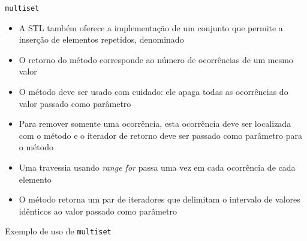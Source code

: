 \begin{frame}[fragile]{\texttt{multiset}}

    \begin{itemize}
        \item A STL também oferece a implementação de um conjunto que permite a inserção de 
            elementos repetidos, denominado 

        \item O retorno do método  corresponde ao número de ocorrências de um 
            mesmo valor

        \item O método  deve ser usado com cuidado: ele apaga todas as ocorrências
            do valor passado como parâmetro

        \item Para remover somente uma ocorrência, esta ocorrência deve ser localizada com o método
             e o iterador de retorno deve ser passado como parâmetro para o
            método 

        \item Uma travessia usando \textit{range for} passa uma vez em cada ocorrência de cada
            elemento

        \item O método  retorna um par de iteradores que delimitam o
            intervalo de valores idênticos ao valor passado como parâmetro
    \end{itemize}

\end{frame}

\begin{frame}[fragile]{Exemplo de uso de \texttt{multiset}}
\end{frame}
